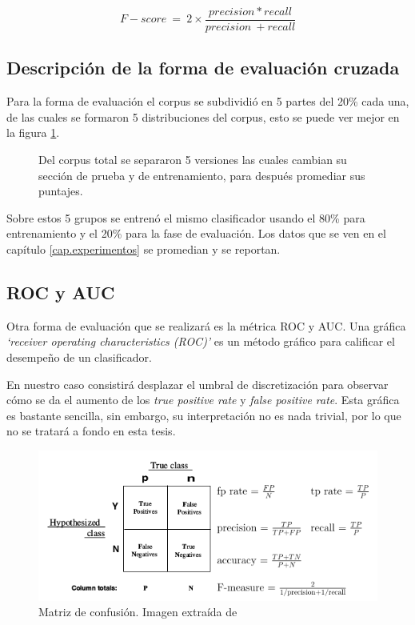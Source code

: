 \begin{figure}[H]
	\centering
	\begin{equation*}
		F-score\ =\ 2 \times  \frac{precision*recall}{precision\ +recall}
	\end{equation*}
\end{figure}

\subsection{Descripción de la forma de evaluación cruzada}

\par Para la forma de evaluación el corpus se subdividió en 5 partes del 20\% cada una, de las cuales se formaron 5 distribuciones del corpus, esto se puede ver mejor en la figura \ref{fig:corpusDiv}.

\begin{figure}
	\centering
	
	\caption{Del corpus total se separaron 5 versiones las cuales cambian su sección de prueba y de entrenamiento, para después promediar sus puntajes.}
	\label{fig:corpusDiv}
\end{figure}

\par Sobre estos 5 grupos se entrenó el mismo clasificador usando el 80\% para entrenamiento y el 20\% para la fase de evaluación. Los datos que se ven en el capítulo \ref{cap.experimentos} se promedian y se reportan.

\subsection{ROC y AUC}

\par Otra forma de evaluación que se realizará es la métrica ROC y AUC. Una gráfica \textit{`receiver operating characteristics (ROC)'} es un método gráfico para calificar el desempeño de un clasificador.
\par En nuestro caso consistirá desplazar el umbral de discretización para observar cómo se da el aumento de los \textit{true positive rate} y \textit{false positive rate}. Esta gráfica es bastante sencilla, sin embargo, su interpretación no es nada trivial, por lo que no se tratará a fondo en esta tesis.

\begin{figure}
	\centering
	\includegraphics[width=\linewidth]{imagenes/confusionMatrix.png}
	\caption{Matriz de confusión. Imagen extraída de \textcite{fawcett2006introduction}}
	\label{fig:confMat}
\end{figure}


